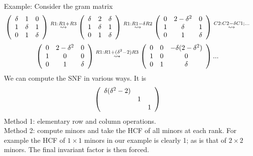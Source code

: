 Example:
Consider the gram matrix
\[
\mat{cccc} \delta & 1 & 0 \\ 1 & \delta & 1 \\ 0 & 1 & \delta
\tam
\stackrel{R1:R1+R3}{\leadsto}
\mat{cccc} \delta & 2 & \delta \\ 1 & \delta & 1 \\ 0 & 1 & \delta
\tam
\stackrel{R1:R1-\delta R2}{\leadsto}
\mat{cccc} 0 & 2-\delta^2 & 0 \\ 1 & \delta & 1 \\ 0 & 1 & \delta
\tam
\stackrel{C2:C2-\delta C1;...}{\leadsto}
\]\[
\mat{cccc} 0 & 2-\delta^2 & 0 \\ 1 & 0 & 0 \\ 0 & 1 & \delta
\tam
\stackrel{R1:R1+(\delta^2 -2) R3}{\leadsto}
\mat{cccc} 0 & 0 & -\delta(2-\delta^2 )  \\ 1 & 0 & 0 \\ 0 & 1 & \delta
\tam
...
\]
We can compute the SNF in various ways. It is
\[
\mat{cccc} \delta (\delta^2 -2) && \\ &1& \\ &&1 \tam
\]
Method 1: elementary row and column operations.
\\
Method 2: compute minors and take the HCF of all minors at each rank. 
For example the HCF of $1\times 1$ minors in our example is clearly 1;
as is that of $2\times 2$ minors. The final invariant factor is then
forced. 










